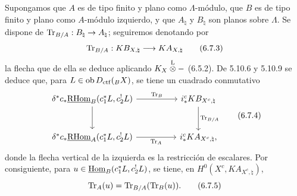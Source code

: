 Supongamos que $A$ es de tipo finito y plano como $\Lambda$-módulo, que $B$ es de tipo finito y plano como $A$-módulo izquierdo, y que $A_{\natural}$ y $B_{\natural}$ son planos sobre $\Lambda$. Se dispone de $\operatorname{Tr}_{B/A}:B_{\natural}\to A_{\natural}$; seguiremos denotando por
\begin{equation}
\operatorname{Tr}_{B/A}:KB_{X,\natural}\longrightarrow KA_{X,\natural}
\tag{6.7.3}
\end{equation}
la flecha que de ella se deduce aplicando $K_X\overset{\mathrm L}{\otimes} -$ (6.5.2). De 5.10.6 y 5.10.9 se deduce que, para $L\in\operatorname{ob} D_{\mathrm{ctf}}({}_BX)$, se tiene un cuadrado conmutativo
\begin{equation}
\begin{tikzcd}[column sep=huge,row sep=large]
\delta^*c_*\uRHom_B(c_1^*L,c_2^!L) \arrow[r,"\Tr_B"] \arrow[d]
& i_*^cKB_{X^c,\natural} \arrow[d,"\Tr_{B/A}"]\\
\delta^*c_*\uRHom_A(c_1^*L,c_2^!L) \arrow[r,"\Tr_A"']
& i_*^cKA_{X^c,\natural},
\end{tikzcd}
\tag{6.7.4}
\end{equation}
donde la flecha vertical de la izquierda es la restricción de escalares. Por consiguiente, para $u\in\underline{\operatorname{Hom}}_B(c_1^*L,c_2^!L)$, se tiene, en $H^0(X^c,KA_{X^c,\natural})$,
\begin{equation}
\operatorname{Tr}_A(u)=\operatorname{Tr}_{B/A}(\operatorname{Tr}_B(u)).
\tag{6.7.5}
\end{equation}
